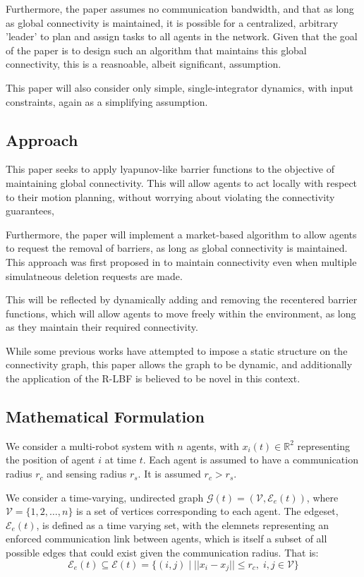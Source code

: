 \documentclass[conference]{IEEEtran}
\begin{document}
Furthermore, the paper assumes no communication bandwidth, and that as long as global connectivity is maintained, it is possible for a centralized,
arbitrary 'leader' to plan and assign tasks to all agents in the network. Given that the goal of the paper is to design such an algorithm that
maintains this global connectivity, this is a reasnoable, albeit significant, assumption.

This paper will also consider only simple, single-integrator dynamics, with input constraints, again as a simplifying assumption.

\subsection{Approach}
This paper seeks to apply lyapunov-like barrier functions to the objective of maintaining global connectivity. This will allow agents to act locally with respect
to their motion planning, without worrying about violating the connectivity guarantees, \cite{panagouDistributedCoordinationControl2016a}

Furthermore, the paper will implement a market-based algorithm to allow agents to request the removal of barriers,
as long as global connectivity is maintained. This approach was first proposed in \cite{michaelMaintainingConnectivityMobile2009} to maintain
connectivity even when multiple simulatneous deletion requests are made.

This will be reflected by dynamically adding and removing the recentered barrier functions, which will allow agents to move freely within the environment, as long as they
maintain their required connectivity.

While some previous works have attempted to impose a static structure on the connectivity graph, this paper allows the graph to be dynamic, 
and additionally the application of the R-LBF is believed to be novel in this context.

\subsection{Mathematical Formulation}
We consider a multi-robot system with $n$ agents, with $x_i(t) \in \mathbb R^2$ representing the position of agent $i$ at time $t$. Each agent is 
assumed to have a communication radius $r_c$ and sensing radius $r_s$. It is assumed $r_c > r_s$.

We consider a time-varying, undirected graph $\mathcal G(t) = (\mathcal V, \mathcal E_e(t))$, where $\mathcal V = \{1, 2, \ldots, n\}$ is a set of vertices corresponding to each agent.
The edgeset, $\mathcal E_e(t)$, is defined as a time varying set, with the elemnets representing an enforced communication link between agents, which is
itself a subset of all possible edges that could exist given the communication radius. 
That is:
\begin{equation}
    \mathcal E_e(t) \subseteq \mathcal E(t) = \{(i, j) \mid ||x_i - x_j|| \leq r_c,\; i, j \in \mathcal V\}
\end{equation}
\end{document}
